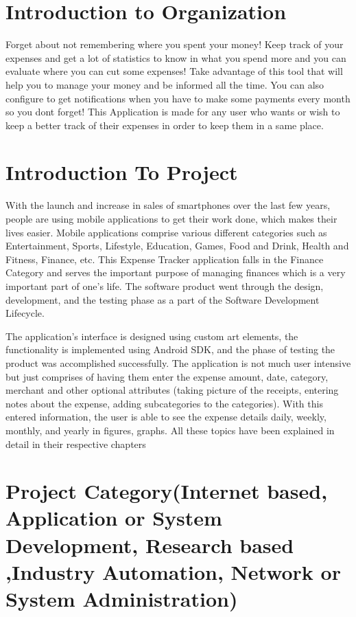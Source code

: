 \section{Introduction to Organization}

Forget about not remembering where you spent your money! Keep track of your expenses and get
a lot of statistics to know in what you spend more and you can evaluate where you can cut some expenses! Take advantage of this tool that will help you to manage your money and be informed
all the time. You can also configure to get notifications when you have to make some payments
every month so you dont forget! This Application is made for any user who wants or wish to keep a better track of their expenses in order to keep them in a same place.
\section{Introduction To Project} 
With the launch and increase in sales of smartphones over the last few years, people are using mobile applications to get their work done, which makes their lives easier. Mobile applications comprise various different categories such as Entertainment, Sports, Lifestyle, Education, Games, Food and Drink, Health and Fitness, Finance, etc. This Expense Tracker application falls in the Finance Category and serves the important purpose of managing finances which is a very important part of one’s life.  The software product went through the design, development, and the testing phase as a part of the Software Development Lifecycle. 

The application’s interface is designed using custom art elements, the functionality is implemented using Android SDK, and the phase of testing the product was accomplished successfully. The application is not much user intensive but just comprises of having them enter the expense amount, date, category, merchant and other optional attributes (taking picture of the receipts, entering notes about the expense, adding subcategories to the categories). With this entered information, the user is able to see the expense details daily, weekly, monthly, and yearly in figures, graphs. All these topics have been explained in detail in their respective chapters

\section{Project Category(Internet based, Application or System Development, Research based ,Industry Automation, Network or System Administration)}

